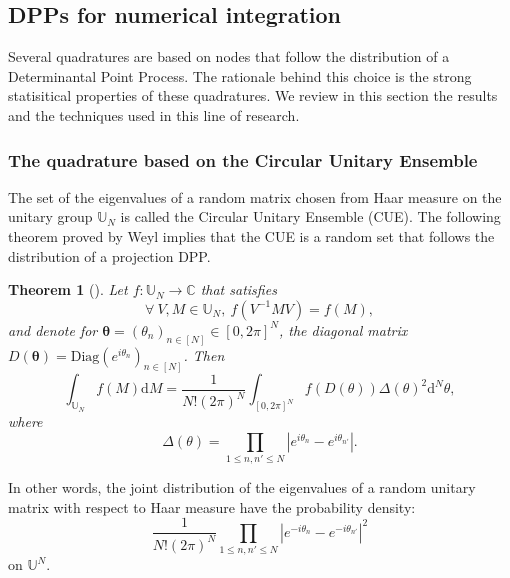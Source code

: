 \documentclass[twoside,11pt]{book}
\newtheorem{theorem}{Theorem}
\begin{document}
\subsection{DPPs for numerical integration}
Several quadratures are based on nodes that follow the distribution of a Determinantal Point Process. The rationale behind this choice is the strong statisitical properties of these quadratures. We review in this section the results and the techniques used in this line of research. 

\subsubsection{The quadrature based on the Circular Unitary Ensemble}

The set of the eigenvalues of a random matrix chosen from Haar measure on the unitary group $\mathbb{U}_{N}$ is called the Circular Unitary Ensemble (CUE). The following theorem proved by Weyl implies that the CUE is a random set that follows the distribution of a projection DPP. 


\begin{theorem}[\cite{Wey46}]
Let $f: \mathbb{U}_{N} \rightarrow \mathbb{C}$ that satisfies
\begin{equation}\label{eq:weil_condition}
\forall \: V, M \in \mathbb{U}_{N}, \:  f(V^{-1}M V) = f(M),
\end{equation}
and denote for $\bm{\theta} = (\theta_{n})_{n \in [N]} \in [0,2\pi]^{N}$, the diagonal matrix $D(\bm{\theta}) = \mathrm{Diag}(e^{i \theta_{n}})_{n \in [N]}$.
Then
\begin{equation}
\int_{\mathbb{U}_{N}}f(M) \mathrm{d}M = \frac{1}{N!(2 \pi)^{N}} \int_{[0,2\pi]^{N}} f(D(\theta)) \Delta(\theta)^{2} \mathrm{d}^{N}\theta,
\end{equation}
where 
\begin{equation}
\Delta(\theta) = \prod\limits_{1 \leq n,n' \leq N} | e^{i \theta_{n}} -e^{i \theta_{n'}} |.
\end{equation}
\end{theorem}


In other words, the joint distribution of the eigenvalues of a random unitary matrix with respect to Haar measure have the probability density:
\begin{equation}\label{eq:haar_eigenvalues_density}
\frac{1}{N!(2\pi)^{N}} \prod\limits_{1 \leq n,n' \leq N} |e^{-i \theta_{n}} - e^{-i \theta_{n'}}|^{2}
\end{equation}
on $\mathbb{U}^{N}$.
\end{document}
